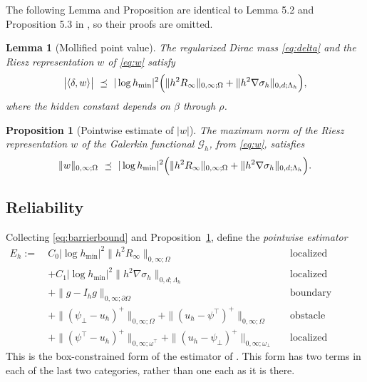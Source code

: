 \documentclass[12pt]{amsart}
\numberwithin{equation}{section}
\theoremstyle{plain}
\newtheorem{proposition}[theorem]{Proposition}
\newtheorem{lemma}[theorem]{Lemma}
\theoremstyle{definition}
\theoremstyle{remark}
\newcommand{\Om}{\Omega}
\newcommand{\dOm}{\partial\Omega}
\newcommand{\psilo}{\psi_\bot}
\newcommand{\psiup}{\psi^\top}
\newcommand{\Ih}{I_h}
\newcommand{\Gh}{\mathcal{G}_h}
\newcommand{\Lamh}{\Lambda_h}
\newcommand{\ombot}{\omega_\bot}
\newcommand{\omtop}{\omega^\top}
\begin{document}
The following Lemma and Proposition are identical to Lemma 5.2 and Proposition 5.3 in \cite{NSV03}, so their proofs are omitted.

\begin{lemma}[Mollified point value]
\label{lem:mollified}
The regularized Dirac mass \eqref{eq:delta} and the Riesz representation $w$ of \eqref{eq:w} satisfy
\begin{equation}
\label{eq:mollified}
  \bigl|\left<\delta,w\right>\bigr| \ \preceq\ |\log h_{\min}|^2 \Bigl(\|h^2R_\infty\|_{0,\infty;\Om} + \|h^2\nabla\sigma_h\|_{0,d;\Lamh}\Bigr),
\end{equation}
where the hidden constant depends on $\beta$ through $\rho$.
\end{lemma}

\begin{proposition}[Pointwise estimate of $|w|$]
\label{prop:wbound}
The maximum norm of the Riesz representation $w$ of the Galerkin functional $\Gh$, from \eqref{eq:w}, satisfies
\begin{equation}
\label{eq:wbound}
  \|w\|_{0,\infty;\Om} \ \preceq\ |\log h_{\min}|^2\Bigl(\|h^2R_\infty\|_{0,\infty;\Om} + \|h^2\nabla\sigma_h\|_{0,d;\Lamh}\Bigr).
\end{equation}
\end{proposition}

\subsection{Reliability}  Collecting \eqref{eq:barrierbound} and Proposition~\ref{prop:wbound}, define the \emph{pointwise estimator}
\begin{equation}
\label{eq:Eh}
\begin{aligned}
  E_h := \ & C_0 |\log h_{\min}|^2 \|h^2 R_\infty\|_{0,\infty;\Om}
    && \text{localized residual} \\
  &+ C_1 |\log h_{\min}|^2 \|h^2\nabla\sigma_h\|_{0,d;\Lamh}
    && \text{localized quadrature} \\
  &+ \|g-\Ih g\|_{0,\infty;\dOm}
    && \text{boundary datum approx.} \\
  &+ \|(\psilo-u_h)^+\|_{0,\infty;\Om} + \|(u_h-\psiup)^+\|_{0,\infty;\Om}
    && \text{obstacle admissibility} \\
  &+ \|(\psiup-u_h)^+\|_{0,\infty;\omtop} + \|(u_h-\psilo)^+\|_{0,\infty;\ombot}
    && \text{localized detachment}
\end{aligned}
\end{equation}
This is the box-constrained form of the estimator of \cite[\S 5.2]{NSV03}.  This form has two terms in each of the last two categories, rather than one each as it is there.
\end{document}
